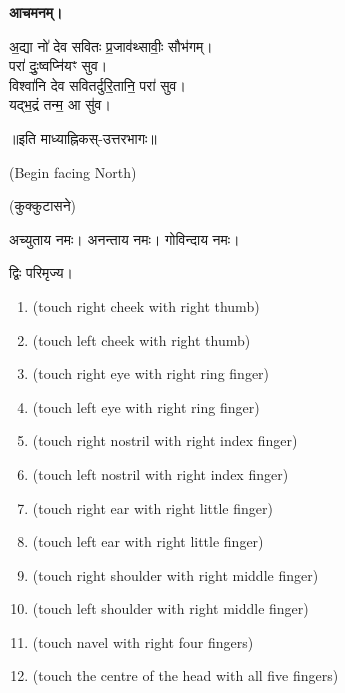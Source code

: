 \textbf{आचमनम्।}


अ॒द्या नो॑ देव सवितः प्र॒जाव॑थ्सावीः॒ सौभ॑गम्।\\
परा॑ दुः॒ष्वप्नि॑यꣳ सुव।\\
विश्वा॑नि देव सवितर्दुरि॒तानि॒ परा॑ सुव।\\
यद्भ॒द्रं तन्म॒ आ सु॑व।

\centerline{॥इति माध्याह्निकस्-उत्तरभागः॥}


\renewcommand{\sectionmark}[1]{%
\markboth{\large #1 (सायं सन्ध्या)}{}}

{\scriptsize (Begin facing North)}


(कुक्कुटासने)

अच्युताय नमः। अनन्ताय नमः। गोविन्दाय नमः। 

द्विः परिमृज्य।


\begin{enumerate}
    \item {} {\scriptsize (touch right cheek with right thumb)}
    \item {} {\scriptsize (touch left cheek with right thumb)}
    \item {} {\scriptsize (touch right eye with right ring finger)}
    \item {} {\scriptsize (touch left eye with right ring finger)}
    \item {} {\scriptsize (touch right nostril with right index finger)}
    \item {} {\scriptsize (touch left nostril with right index finger)}
    \item {} {\scriptsize (touch right ear with right little finger)}
    \item {} {\scriptsize (touch left ear with right little finger)}
    \item {} {\scriptsize (touch right shoulder with right middle finger)}
    \item {} {\scriptsize (touch left shoulder with right middle finger)}
    \item {} {\scriptsize (touch navel with right four fingers)}
    \item {} {\scriptsize (touch the centre of the head with all five fingers)}
\end{enumerate}


